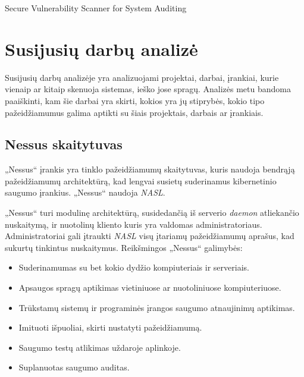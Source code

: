 \documentclass[a4paper,12pt,fleqn]{article}
\begin{document}
\bothabstracts{}%
{Secure Vulnerability Scanner for System Auditing} %
{}%






\newpage
\section{Susijusių darbų analizė}
\label{sec:motivation}

Susijusių darbų analizėje yra analizuojami projektai, darbai, įrankiai, kurie vienaip ar kitaip skenuoja sistemas, ieško jose spragų. Analizės metu bandoma paaiškinti, kam šie darbai yra skirti, kokios yra jų stiprybės, kokio tipo pažeidžiamumus galima aptikti su šiais projektais, darbais ar įrankiais.

\subsection{Nessus skaitytuvas}
\label{sec:example}

„Nessus“ įrankis yra tinklo pažeidžiamumų skaitytuvas, kuris naudoja bendrąją pažeidžiamumų architektūrą, kad lengvai susietų suderinamus kibernetinio saugumo įrankius. „Nessus“ naudoja \textit{NASL}\cite{rogers2011nessus}. 

„Nessus“ turi modulinę architektūrą, susidedančią iš serverio \textit{daemon} atliekančio nuskaitymą, ir nuotolinų kliento kuris yra valdomas administratoriaus. Administratoriai gali įtraukti \textit{NASL} visų įtariamų pažeidžiamumų aprašus, kad sukurtų tinkintus nuskaitymus. Reikšmingos „Nessus“ galimybės:

\begin{itemize}
	\item Suderinamumas su bet kokio dydžio kompiuteriais ir serveriais.
	\item Apsaugos spragų aptikimas vietiniuose ar nuotoliniuose kompiuteriuose.
	\item Trūkstamų sistemų ir programinės įrangos saugumo atnaujinimų aptikimas.
	\item Imituoti išpuoliai, skirti nustatyti pažeidžiamumą.
	\item Saugumo testų atlikimas uždaroje aplinkoje.
	\item Suplanuotas saugumo auditas.
\end{itemize}
\end{document}
